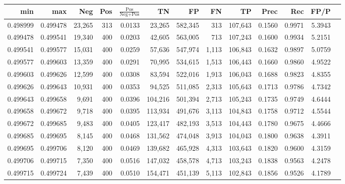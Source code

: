 \begin{tabular}{rrrrrrrrrrrrr}
\toprule
     min &      max &    Neg & Pos & $\frac{\text{Pos}}{\text{Neg}+\text{Pos}}$ &      TN &      FP &      FN &      TP &   Prec &    Rec &   FP/P \\
\midrule
0.498999 & 0.499478 & 23,265 & 313 &                                     0.0133 &  23,265 & 582,345 &     313 & 107,643 & 0.1560 & 0.9971 & 5.3943 \\
0.499478 & 0.499541 & 19,340 & 400 &                                     0.0203 &  42,605 & 563,005 &     713 & 107,243 & 0.1600 & 0.9934 & 5.2151 \\
0.499541 & 0.499577 & 15,031 & 400 &                                     0.0259 &  57,636 & 547,974 &   1,113 & 106,843 & 0.1632 & 0.9897 & 5.0759 \\
0.499577 & 0.499603 & 13,359 & 400 &                                     0.0291 &  70,995 & 534,615 &   1,513 & 106,443 & 0.1660 & 0.9860 & 4.9522 \\
0.499603 & 0.499626 & 12,599 & 400 &                                     0.0308 &  83,594 & 522,016 &   1,913 & 106,043 & 0.1688 & 0.9823 & 4.8355 \\
0.499626 & 0.499643 & 10,931 & 400 &                                     0.0353 &  94,525 & 511,085 &   2,313 & 105,643 & 0.1713 & 0.9786 & 4.7342 \\
0.499643 & 0.499658 &  9,691 & 400 &                                     0.0396 & 104,216 & 501,394 &   2,713 & 105,243 & 0.1735 & 0.9749 & 4.6444 \\
0.499658 & 0.499672 &  9,718 & 400 &                                     0.0395 & 113,934 & 491,676 &   3,113 & 104,843 & 0.1758 & 0.9712 & 4.5544 \\
0.499672 & 0.499685 &  9,483 & 400 &                                     0.0405 & 123,417 & 482,193 &   3,513 & 104,443 & 0.1780 & 0.9675 & 4.4666 \\
0.499685 & 0.499695 &  8,145 & 400 &                                     0.0468 & 131,562 & 474,048 &   3,913 & 104,043 & 0.1800 & 0.9638 & 4.3911 \\
0.499695 & 0.499706 &  8,120 & 400 &                                     0.0469 & 139,682 & 465,928 &   4,313 & 103,643 & 0.1820 & 0.9600 & 4.3159 \\
0.499706 & 0.499715 &  7,350 & 400 &                                     0.0516 & 147,032 & 458,578 &   4,713 & 103,243 & 0.1838 & 0.9563 & 4.2478 \\
0.499715 & 0.499724 &  7,439 & 400 &                                     0.0510 & 154,471 & 451,139 &   5,113 & 102,843 & 0.1856 & 0.9526 & 4.1789 \\

\end{tabular}
